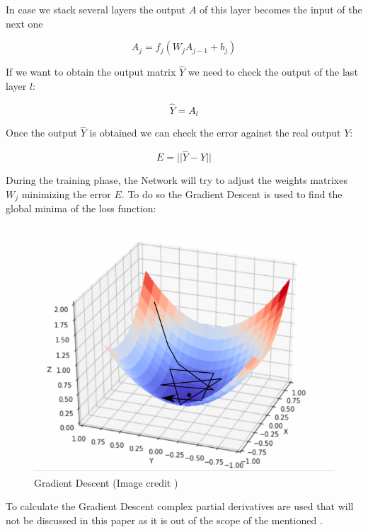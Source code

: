 In case we stack several layers the output $A$ of this layer becomes the input of the next one

$$ A_j = f_j(W_jA_{j-1} + b_j) $$

If we want to obtain the output matrix $\hat{Y}$ we need to check the output of the last layer $l$:

$$ \hat{Y} = A_l $$

Once the output $\hat{Y}$ is obtained we can check the error against the real output $Y$:

$$ E = || \hat{Y} - Y || $$

During the training phase, the Network will try to adjust the weights matrixes $W_j$ minimizing the error $E$.
To do so the Gradient Descent is used to find the global minima of the loss function:

\begin{figure}[th]
    \centering
    \includegraphics[width=1.0\textwidth]{Figures/GDescent.png}
    \decoRule
    \caption[Gradient Descent]{Gradient Descent (Image credit \cite{mathann})}
    \label{fig:Gradient Descent}
\end{figure}

To calculate the Gradient Descent complex partial derivatives are used that will not be discussed in this paper as it is out of the scope of the mentioned \cite{Suykens1996} \cite{Werbos1990}.